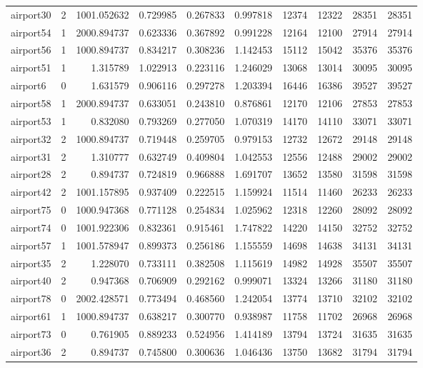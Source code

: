 \begin{longtable}{|l|r|r|r|r|r|r|r|r|r|}
airport30 & 2 & 1001.052632 & 0.729985 & 0.267833 & 0.997818 & 12374 & 12322 & 28351 & 28351 \\
airport54 & 1 & 2000.894737 & 0.623336 & 0.367892 & 0.991228 & 12164 & 12100 & 27914 & 27914 \\
airport56 & 1 & 1000.894737 & 0.834217 & 0.308236 & 1.142453 & 15112 & 15042 & 35376 & 35376 \\
airport51 & 1 & 1.315789 & 1.022913 & 0.223116 & 1.246029 & 13068 & 13014 & 30095 & 30095 \\
airport6 & 0 & 1.631579 & 0.906116 & 0.297278 & 1.203394 & 16446 & 16386 & 39527 & 39527 \\
airport58 & 1 & 2000.894737 & 0.633051 & 0.243810 & 0.876861 & 12170 & 12106 & 27853 & 27853 \\
airport53 & 1 & 0.832080 & 0.793269 & 0.277050 & 1.070319 & 14170 & 14110 & 33071 & 33071 \\
airport32 & 2 & 1000.894737 & 0.719448 & 0.259705 & 0.979153 & 12732 & 12672 & 29148 & 29148 \\
airport31 & 2 & 1.310777 & 0.632749 & 0.409804 & 1.042553 & 12556 & 12488 & 29002 & 29002 \\
airport28 & 2 & 0.894737 & 0.724819 & 0.966888 & 1.691707 & 13652 & 13580 & 31598 & 31598 \\
airport42 & 2 & 1001.157895 & 0.937409 & 0.222515 & 1.159924 & 11514 & 11460 & 26233 & 26233 \\
airport75 & 0 & 1000.947368 & 0.771128 & 0.254834 & 1.025962 & 12318 & 12260 & 28092 & 28092 \\
airport74 & 0 & 1001.922306 & 0.832361 & 0.915461 & 1.747822 & 14220 & 14150 & 32752 & 32752 \\
airport57 & 1 & 1001.578947 & 0.899373 & 0.256186 & 1.155559 & 14698 & 14638 & 34131 & 34131 \\
airport35 & 2 & 1.228070 & 0.733111 & 0.382508 & 1.115619 & 14982 & 14928 & 35507 & 35507 \\
airport40 & 2 & 0.947368 & 0.706909 & 0.292162 & 0.999071 & 13324 & 13266 & 31180 & 31180 \\
airport78 & 0 & 2002.428571 & 0.773494 & 0.468560 & 1.242054 & 13774 & 13710 & 32102 & 32102 \\
airport61 & 1 & 1000.894737 & 0.638217 & 0.300770 & 0.938987 & 11758 & 11702 & 26968 & 26968 \\
airport73 & 0 & 0.761905 & 0.889233 & 0.524956 & 1.414189 & 13794 & 13724 & 31635 & 31635 \\
airport36 & 2 & 0.894737 & 0.745800 & 0.300636 & 1.046436 & 13750 & 13682 & 31794 & 31794 \\

\end{longtable}
